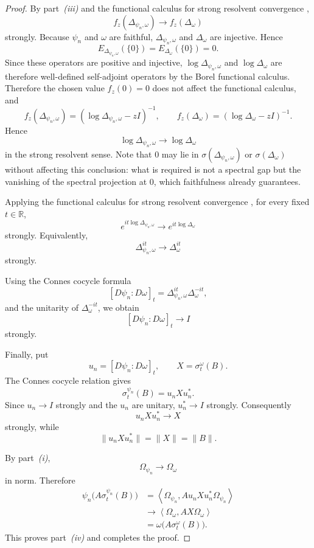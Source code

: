 \documentclass[11pt]{article}
\begin{document}
\begin{proof}
By part~\emph{(iii)} and the functional calculus for strong resolvent
convergence
\cite[Thm.~VIII.20]{ReedSimon1980},
\[
f_z(\Delta_{\psi_n,\omega})
\longrightarrow
f_z(\Delta_\omega)
\]
strongly. Because $\psi_n$ and $\omega$ are faithful,
$\Delta_{\psi_n,\omega}$ and $\Delta_\omega$ are injective. Hence
\[
E_{\Delta_{\psi_n,\omega}}(\{0\})
=
E_{\Delta_\omega}(\{0\})
=
0.
\]
Since these operators are positive and injective,
$\log\Delta_{\psi_n,\omega}$ and $\log\Delta_\omega$ are therefore
well-defined self-adjoint operators by the Borel functional calculus.
Therefore the chosen value $f_z(0)=0$ does not affect the functional
calculus, and
\[
f_z(\Delta_{\psi_n,\omega})
=
(\log\Delta_{\psi_n,\omega}-zI)^{-1},
\qquad
f_z(\Delta_\omega)
=
(\log\Delta_\omega-zI)^{-1}.
\]
Hence
\[
\log\Delta_{\psi_n,\omega}
\longrightarrow
\log\Delta_\omega
\]
in the strong resolvent sense. Note that $0$ may lie in
$\sigma(\Delta_{\psi_n,\omega})$ or $\sigma(\Delta_\omega)$ without
affecting this conclusion: what is required is not a spectral gap but
the vanishing of the spectral projection at $0$, which faithfulness
already guarantees.

Applying the functional calculus for strong resolvent convergence
\cite[Thm.~VIII.20]{ReedSimon1980}, for every fixed $t\in\mathbb R$,
\[
e^{it\log\Delta_{\psi_n,\omega}}
\longrightarrow
e^{it\log\Delta_\omega}
\]
strongly. Equivalently,
\[
\Delta_{\psi_n,\omega}^{it}
\longrightarrow
\Delta_\omega^{it}
\]
strongly.

Using the Connes cocycle formula
\[
[D\psi_n:D\omega]_t
=
\Delta_{\psi_n,\omega}^{it}\Delta_\omega^{-it},
\]
and the unitarity of $\Delta_\omega^{-it}$, we obtain
\[
[D\psi_n:D\omega]_t
\longrightarrow I
\]
strongly.

Finally, put
\[
u_n=[D\psi_n:D\omega]_t,
\qquad
X=\sigma_t^\omega(B).
\]
The Connes cocycle relation gives
\[
\sigma_t^{\psi_n}(B)
=
u_nXu_n^*.
\]
Since $u_n\to I$ strongly and the $u_n$ are unitary,
$u_n^*\to I$ strongly. Consequently
\[
u_nXu_n^*
\longrightarrow X
\]
strongly, while
\[
\|u_nXu_n^*\|=\|X\|=\|B\|.
\]

By part~\emph{(i)},
\[
\Omega_{\psi_n}\longrightarrow\Omega_\omega
\]
in norm. Therefore
\[
\begin{aligned}
\psi_n\bigl(A\sigma_t^{\psi_n}(B)\bigr)
&=
\left\langle
\Omega_{\psi_n},
Au_nXu_n^*\Omega_{\psi_n}
\right\rangle
\\
&\longrightarrow
\left\langle
\Omega_\omega,
AX\Omega_\omega
\right\rangle
\\
&=
\omega\bigl(A\sigma_t^\omega(B)\bigr).
\end{aligned}
\]
This proves part~\emph{(iv)} and completes the proof.
\end{proof}
\end{document}
